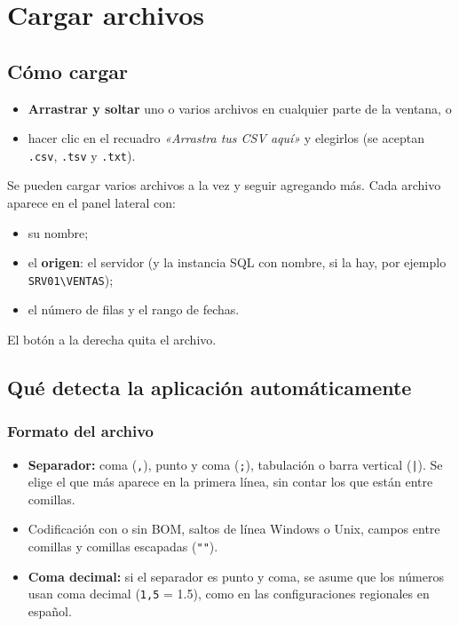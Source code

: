 \documentclass[11pt,a4paper,oneside]{report}
\newcommand{\boton}[1]{\fcolorbox{linea}{white}{\small\sffamily #1}}
\newcommand{\bs}{\textbackslash}
\begin{document}
\chapter{Cargar archivos}

\section{Cómo cargar}

\begin{itemize}
  \item \textbf{Arrastrar y soltar} uno o varios archivos en cualquier parte de
        la ventana, o
  \item hacer clic en el recuadro \emph{«Arrastra tus CSV aquí»} y elegirlos
        (se aceptan \texttt{.csv}, \texttt{.tsv} y \texttt{.txt}).
\end{itemize}

Se pueden cargar varios archivos a la vez y seguir agregando más. Cada
archivo aparece en el panel lateral con:

\begin{itemize}
  \item su nombre;
  \item el \textbf{origen}: el servidor (y la instancia SQL con nombre, si la
        hay, por ejemplo \texttt{SRV01\bs VENTAS});
  \item el número de filas y el rango de fechas.
\end{itemize}

El botón \boton{\texttimes} a la derecha quita el archivo.

\section{Qué detecta la aplicación automáticamente}

\subsection{Formato del archivo}
\begin{itemize}
  \item \textbf{Separador:} coma (\texttt{,}), punto y coma (\texttt{;}),
        tabulación o barra vertical (\texttt{|}). Se elige el que más aparece
        en la primera línea, sin contar los que están entre comillas.
  \item Codificación con o sin BOM, saltos de línea Windows o Unix, campos
        entre comillas y comillas escapadas (\texttt{""}).
  \item \textbf{Coma decimal:} si el separador es punto y coma, se asume que los
        números usan coma decimal (\texttt{1,5} = 1.5), como en las
        configuraciones regionales en español.
\end{itemize}
\end{document}
